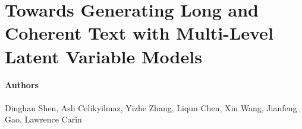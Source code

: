 \section{Towards Generating Long and Coherent Text with Multi-Level Latent Variable Models }
\paragraph{Authors} Dinghan Shen, Asli Celikyilmaz, Yizhe Zhang, Liqun Chen, Xin Wang, Jianfeng Gao, Lawrence Carin \cite{shen_towards_2019} \\

